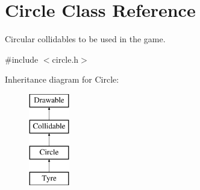 \hypertarget{class_circle}{}\section{Circle Class Reference}
\label{class_circle}


Circular collidables to be used in the game.  




{\ttfamily \#include $<$circle.\+h$>$}

Inheritance diagram for Circle\+:\begin{figure}[H]
\begin{center}
\leavevmode
\includegraphics[height=4.000000cm]{class_circle}
\end{center}
\end{figure}
